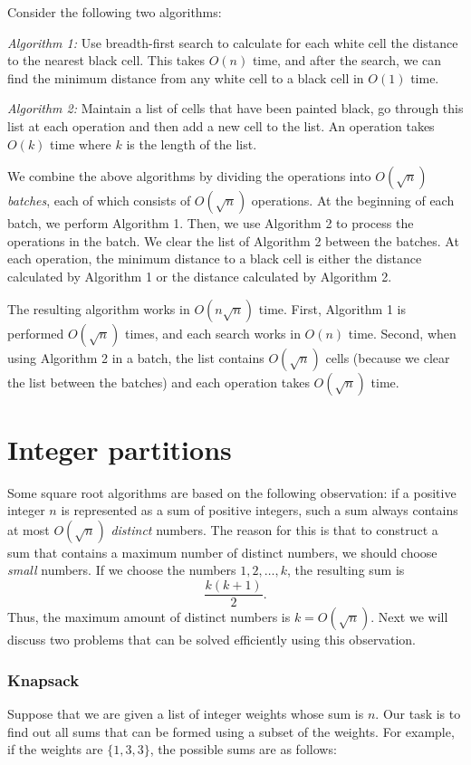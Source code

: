 Consider the following two algorithms:

\emph{Algorithm 1:} Use breadth-first search
to calculate
for each white cell the distance to the nearest black cell.
This takes $O(n)$ time, and after the search,
we can find the minimum distance from any white cell
to a black cell in $O(1)$ time.

\emph{Algorithm 2:} Maintain a list of cells that have been
painted black, go through this list at each operation
and then add a new cell to the list.
An operation takes $O(k)$ time where $k$ is the length of the list.

We combine the above algorithms by
dividing the operations into
$O(\sqrt n)$ \emph{batches}, each of which consists
of $O(\sqrt n)$ operations.
At the beginning of each batch,
we perform Algorithm 1.
Then, we use Algorithm 2 to process the operations
in the batch.
We clear the list of Algorithm 2 between
the batches.
At each operation,
the minimum distance to a black cell
is either the distance calculated by Algorithm 1
or the distance calculated by Algorithm 2.

The resulting algorithm works in
$O(n \sqrt n)$ time.
First, Algorithm 1 is performed $O(\sqrt n)$ times,
and each search works in $O(n)$ time.
Second, when using Algorithm 2 in a batch,
the list contains $O(\sqrt n)$ cells
(because we clear the list between the batches)
and each operation takes $O(\sqrt n)$ time.

\section{Integer partitions}

Some square root algorithms are based on
the following observation:
if a positive integer $n$ is represented as
a sum of positive integers,
such a sum always contains at most
$O(\sqrt n)$ \emph{distinct} numbers.
The reason for this is that to construct
a sum that contains a maximum number of distinct
numbers, we should choose \emph{small} numbers.
If we choose the numbers $1,2,\ldots,k$,
the resulting sum is
\[\frac{k(k+1)}{2}.\]
Thus, the maximum amount of distinct numbers is $k = O(\sqrt n)$.
Next we will discuss two problems that can be solved
efficiently using this observation.

\subsubsection{Knapsack}

Suppose that we are given a list of integer weights
whose sum is $n$.
Our task is to find out all sums that can be formed using
a subset of the weights. For example, if the weights are
$\{1,3,3\}$, the possible sums are as follows:

